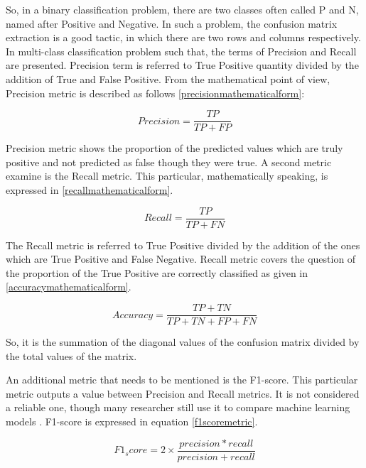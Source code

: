\documentclass[review]{elsarticle}
\begin{document}
So, in a binary classification problem, there are two classes often called P and N, named after Positive and Negative. In such a problem, the confusion matrix extraction is a good tactic, in which there are two rows and columns respectively. In multi-class classification problem such that, the terms of Precision and Recall are presented. Precision term is referred to True Positive quantity divided by the addition of True and False Positive. From the mathematical point of view, Precision metric is described as follows \ref{precisionmathematicalform}:


\begin{equation}\label{precisionmathematicalform}
		Precision  = \frac{TP}{TP + FP}
\end{equation}

Precision metric shows the proportion of the predicted values which are truly positive and not predicted as false though they were true. 
A second metric examine is the Recall metric. This particular, mathematically speaking, is expressed in \ref{recallmathematicalform}.

\begin{equation}\label{recallmathematicalform}
		Recall = \frac{TP}{TP + FN}
\end{equation}

The Recall metric is referred to True Positive divided by the addition of the ones which are True Positive and False Negative. Recall metric covers the question of the proportion of the True Positive are correctly classified as given in \ref{accuracymathematicalform}. 

\begin{equation}\label{accuracymathematicalform}
		Accuracy = \frac{TP + TN}{TP + TN + FP + FN}
\end{equation}

So, it is the summation of the diagonal values of the confusion matrix divided by the total values of the matrix.

An additional metric that needs to be mentioned is the F1-score. This particular metric outputs a value between Precision and Recall metrics. It is not considered a reliable one, though many researcher still use it to compare machine learning models \cite{f1score}. F1-score is expressed in equation \ref{f1scoremetric}.

\begin{equation}\label{f1scoremetric}
		F1_score = 2 \times \frac{precision*recall}{precision + recall}
\end{equation}
\end{document}
